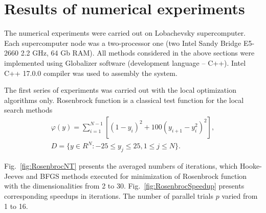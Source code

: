 \documentclass[runningheads]{llncs}
\begin{document}
\section{Results of numerical experiments}\label{sec:results}

The numerical experiments were carried out on Lobachevsky supercomputer. Each supercomputer node was a two-processor one (two Intel Sandy Bridge E5-2660 2.2 GHz, 64 Gb RAM). All methods considered in the above sections were implemented using Globalizer software \cite{globalizerSystem} (development language – C++). Intel C++ 17.0.0 compiler was used to assembly the system.

The first series of experiments was carried out with the local optimization algorithms only. Rosenbrock function is a classical test function for the local search methods 
\begin{gather}
    \varphi(y) = \sum_{i=1}^{N-1} \left[(1-y_i)^2 + 100(y_{i+1} - y_i^2)^2\right], \nonumber \\
    D = \{ y \in R^N: -25 \leq y_j \leq 25, 1 \leq j \leq N \}. \nonumber
\end{gather}

Fig.~\ref{fig:RosenbrocNT} presents the averaged numbers of iterations, which Hooke-Jeeves and BFGS methods executed for minimization of Rosenbrock function with the dimensionalities from 2 to 30. Fig.~\ref{fig:RosenbrocSpeedup} presents corresponding speedups in iterations. The number of parallel trials $p$ varied from 1 to 16.
\end{document}
